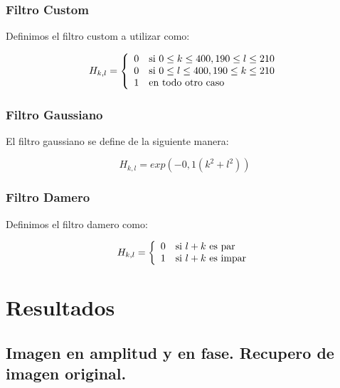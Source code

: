 \documentclass[twocolumn,a4paper,10pt]{article}
\begin{document}
\subsubsection{Filtro Custom}

Definimos el filtro custom a utilizar como:

\begin{equation}
    H_{k,l} = \left\{
                    \begin{array}{c l}
                        0 & \mbox{si } 0 \leq k \leq 400, 190 \leq l \leq 210\\
                        0 & \mbox{si } 0 \leq l \leq 400, 190 \leq k \leq 210\\
                        1 & \mbox{en todo otro caso}
                    \end{array}               
               \right.
\end{equation}

\subsubsection{Filtro Gaussiano}

El filtro gaussiano se define de la siguiente manera:

\begin{equation}
    H_{k,l} = exp(-0,1(k^2 + l^2))
\end{equation}


\subsubsection{Filtro Damero}

Definimos el filtro damero como:

\begin{equation}
    H_{k,l} = \left\{
                    \begin{array}{c l}
                        0 & \mbox{si } l+k \mbox{ es par} \\
                        1 & \mbox{si } l+k \mbox{ es impar}
                    \end{array}               
               \right.
\end{equation}

\section{Resultados}
\label{sec:resultados}

\subsection{Imagen en amplitud y en fase. Recupero de imagen original.}
\end{document}
